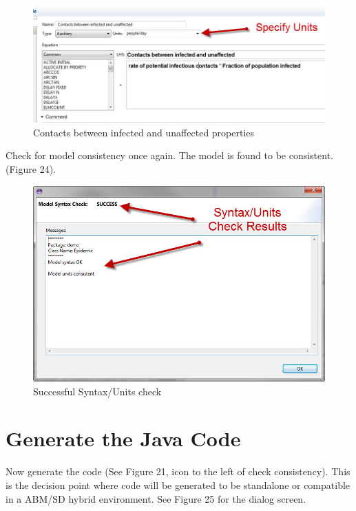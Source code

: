\documentclass[11pt]{amsart}
\begin{document}
\begin{figure}[ht]
\begin{center}
\vspace{.2in}
\centerline {
\includegraphics[totalheight=0.3\textheight]{images/023.jpg}
}
\caption{Contacts between infected and unaffected properties}
\label{fig:023}
\end{center}
\end{figure}

Check for model consistency once again. The model is found to be consistent. (Figure 24).


\begin{figure}[ht]
\begin{center}
\vspace{.2in}
\centerline {
\includegraphics[totalheight=0.3\textheight]{images/024.jpg}
}
\caption{Successful Syntax/Units check}
\label{fig:024}
\end{center}
\end{figure}

\section{Generate the Java Code}
Now generate the code (See Figure 21, icon to the left of check consistency). This is the decision point where code will be generated to be standalone or compatible in a ABM/SD hybrid environment. See Figure 25 for the dialog screen.
\end{document}
